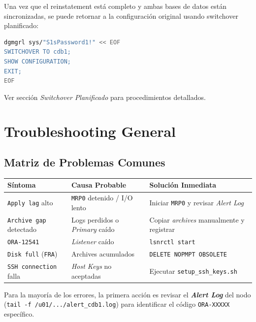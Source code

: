 \documentclass[11pt, a4paper]{report}
\begin{document}
Una vez que el reinstatement está completo y ambas bases de datos están sincronizadas, se puede retornar a la configuración original usando switchover planificado:

\begin{lstlisting}[language=bash, caption={Switchover de Retorno a Configuración Original}]
dgmgrl sys/"S1sPassword1!" << EOF
SWITCHOVER TO cdb1;
SHOW CONFIGURATION;
EXIT;
EOF
\end{lstlisting}

Ver sección \textit{Switchover Planificado} para procedimientos detallados.

\section{Troubleshooting General}

\subsection{Matriz de Problemas Comunes}

\begingroup
\setlength{\tabcolsep}{6pt} %
\par\noindent
\begin{tabular*}{\textwidth}{@{\extracolsep{\fill}}lll}
    \toprule
    \textbf{Síntoma} & \textbf{Causa Probable} & \textbf{Solución Inmediata} \\
    \midrule
    \texttt{Apply lag} alto & \texttt{MRP0} detenido / I/O lento & Iniciar \texttt{MRP0} y revisar \textit{Alert Log} \\
    \addlinespace
    \texttt{Archive gap} detectado & Logs perdidos o \textit{Primary} caído & Copiar \textit{archives} manualmente y registrar \\
    \addlinespace
    \texttt{ORA-12541} & \textit{Listener} caído & \texttt{lsnrctl start} \\
    \addlinespace
    \texttt{Disk full} (\texttt{FRA}) & Archives acumulados & \texttt{DELETE NOPMPT OBSOLETE} \\
    \addlinespace
    \texttt{SSH connection} falla & \textit{Host Keys} no aceptadas & Ejecutar \texttt{setup\_ssh\_keys.sh} \\
    \bottomrule
\end{tabular*}
\par\vspace{\baselineskip} %
\endgroup

Para la mayoría de los errores, la primera acción es revisar el \textbf{\textit{Alert Log}} del nodo (\texttt{tail -f /u01/.../alert\_cdb1.log}) para identificar el código \texttt{ORA-XXXXX} específico.
\end{document}
